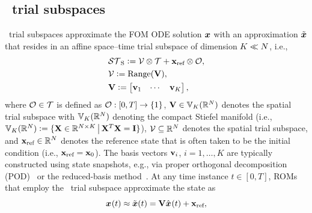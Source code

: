 \documentclass[3p,computermodern,10pt]{elsarticle}
\begin{document}
\subsection{\spatialAcronym\ trial subspaces}
\spatialAcronym\ trial subspaces approximate the FOM ODE solution
	${\boldsymbol x}$ with an approximation $\tilde{\boldsymbol x}$ that resides in an
	affine space--time trial subspace of dimension $K\ll N$, i.e., 
\begin{equation}\label{eq:spatial_subspace}
\begin{split}
& \stspaceS \defeq \trialspace \otimes \timeSpace +
	\stateIntercept\otimes\onesFunction,\\ 
& \trialspace \defeq \text{Range}(\basismat),  \\%
&\basismat \defeq \begin{bmatrix}  \basisvec_1  & \cdots &  \basisvec_K \end{bmatrix}, %
\end{split}
\end{equation}
where 
$\mathcal{O}\in\mathcal{T}$ is defined as $\mathcal{O}:[0,T]\rightarrow\{1\}$,
	$\mathbf {V} \in \mathbb{V}_{K}(\mathbb{R}^{N})$ denotes the spatial trial subspace with
	$\mathbb{V}_{K}(\mathbb{R}^{N})$ denoting the compact Stiefel manifold (i.e.,  $
	\mathbb{V}_{K}(\mathbb{R}^{N})\vcentcolon=
	\{ \mathbf{X} \in \mathbb{R}^{N
	\times K}\, \big|\, \mathbf{X}^T \mathbf{X} = \mathbf{I} \}$),
	$\mathcal{V }\subseteq\mathbb{R}^{N}$ denotes the spatial trial subspace, and
	$\mathbf{x}_\text{ref} \in \mathbb{R}^{N}$ denotes the reference state that
	is often taken to be the initial condition (i.e., $\mathbf{x}_\text{ref} = {{\mathbf{x}}_0}$). 
The basis vectors $\mathbf{v}_i$, $i=1,\ldots,K$ are typically constructed
using state snapshots, e.g., via
proper orthogonal decomposition (POD)~\cite{berkooz_turbulence_pod} or the reduced-basis method~\cite{rb_1,rb_2,rb_3,NgocCuong2005,Rozza2008}. 
At any time instance $t\in[0,T]$, ROMs that employ the  \spatialAcronym\ trial subspace approximate the state as
\begin{equation}\label{eq:affine_trialspace}
{\boldsymbol x}^{}(t) \approx \tilde{\boldsymbol x}(t) = \mathbf {V} \hat{ \boldsymbol x}^{}(t) + \mathbf{x}_\text{ref},
\end{equation}
\end{document}
